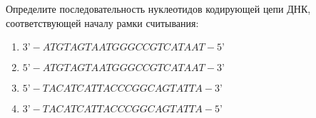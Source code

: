 
Определите последовательность нуклеотидов
кодирующей цепи ДНК, соответствующей началу рамки считывания:

\begin{enumerate}
    \item $3’-ATGTAGTAATGGGCCGTCATAAT-5’$
    \item $5’-ATGTAGTAATGGGCCGTCATAAT-3’$
    \item $5’-TACATCATTACCCGGCAGTATTA-3’$
    \item $3’-TACATCATTACCCGGCAGTATTA-5’$
\end{enumerate}

\explanationSection


